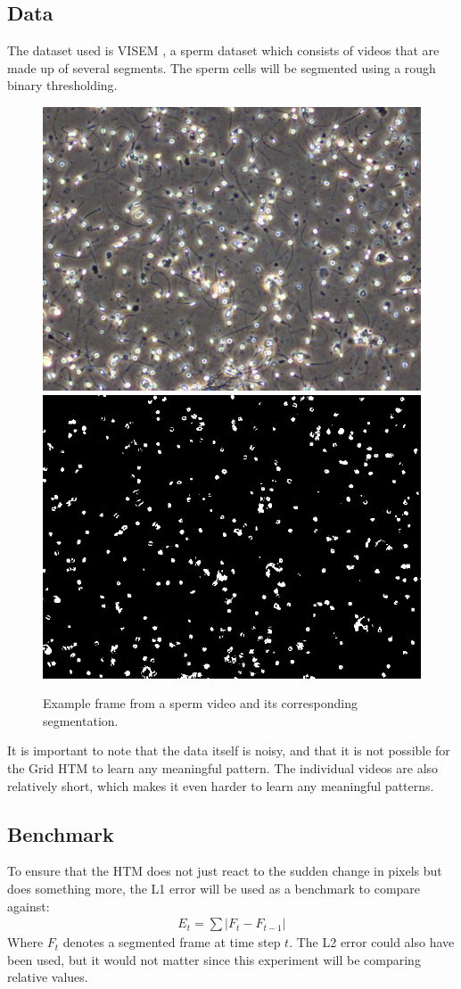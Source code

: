 \subsection{Data}
The dataset used is VISEM \cite{VISEM}, a sperm dataset which consists of videos that are made up of several segments. The sperm cells will be segmented using a rough binary thresholding.
\begin{figure}[H]
    \centering
    \includegraphics[width=.45\textwidth]{resources/experiments/sperm/sperm_example.png}
    \includegraphics[width=.45\textwidth]{resources/experiments/sperm/sperm_seg_example.png}
    \caption{Example frame from a sperm video and its corresponding segmentation.}
\end{figure}
It is important to note that the data itself is noisy, and that it is not possible for the Grid HTM to learn any meaningful pattern. The individual videos are also relatively short, which makes it even harder to learn any meaningful patterns.
\subsection{Benchmark}
To ensure that the HTM does not just react to the sudden change in pixels but does something more, the L1 error will be used as a benchmark to compare against:
\begin{align*}
    E_t=\sum|F_t-F_{t-1}|
\end{align*}
Where $F_t$ denotes a segmented frame at time step $t$. The L2 error could also have been used, but it would not matter since this experiment will be comparing relative values.
